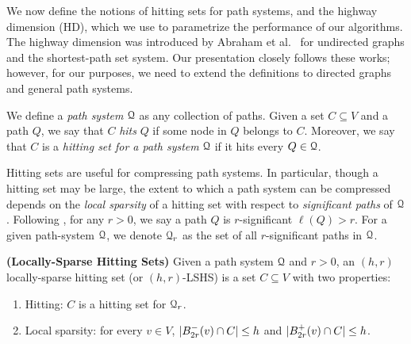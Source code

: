 
We now define the notions of hitting sets for path systems, and the highway dimension (HD), which we use to parametrize the performance of our algorithms. The highway dimension was introduced by Abraham et al.~\cite{highway2010,highway2013} for undirected graphs and the shortest-path set system. Our presentation closely follows these works; however, for our purposes, we need to extend the definitions to directed graphs and general path systems.


We define a \emph{path system} $\mathcal{Q}$ as any collection of paths. Given a set $C\subseteq V$ and a path $Q$, we say that $C$ \emph{hits} $Q$ if some node in $Q$ belongs to $C$. Moreover, we say that $C$ is a \emph{hitting set for a path system} $\mathcal{Q}$ if it hits every $Q\in\mathcal{Q}$.


Hitting sets are useful for compressing path systems. In particular, though a hitting set may be large, the extent to which a path system can be compressed depends on the \emph{local sparsity} of a hitting set with respect to \emph{significant paths} of $\mathcal{Q}$. 
Following \cite{highway2013}, for any $r>0$, we say a path $Q$ is $r$-significant $\ell(Q)>r$. For a given path-system $\mathcal{Q}$, we denote $\mathcal{Q}_r$ as the set of all $r$-significant paths in $\mathcal{Q}$.
\begin{definition}
\label{def:lshs}
\textbf{(Locally-Sparse Hitting Sets)} Given a path system $\mathcal{Q}$ and $r>0$, an $(h,r)$ locally-sparse hitting set (or $(h,r)$-LSHS) is a set $C\subseteq V$ with two properties: 
\begin{enumerate}[nosep]
\item Hitting: $C$ is a hitting set for $\mathcal{Q}_r$.
\item Local sparsity: for every $v\in V$, $\lvert B^-_{2r}(v)\cap C\rvert\leq h$ and $\lvert B^+_{2r}(v)\cap C\rvert\leq h$.
\end{enumerate}
\end{definition}

